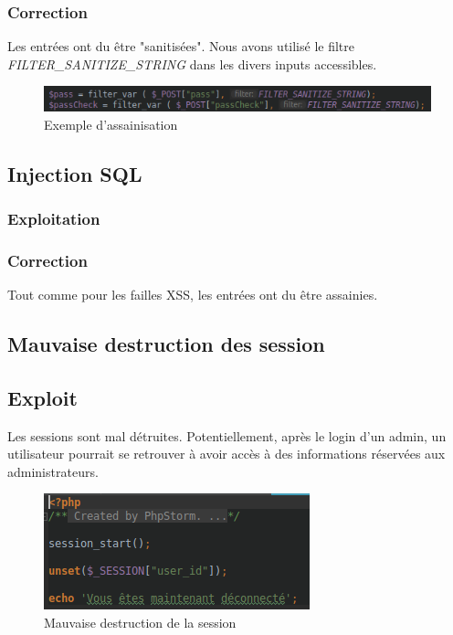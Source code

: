 \documentclass[12pt]{article}
\begin{document}
\subsubsection{Correction}
Les entrées ont du être "sanitisées". Nous avons utilisé le filtre \textit{FILTER\_SANITIZE\_STRING} dans les divers inputs accessibles.
\begin{figure}[H]
\centering
\includegraphics[width=\linewidth]{images/sanitize.png}
\caption{Exemple d'assainisation}
\end{figure}

\subsection{Injection SQL}
\subsubsection{Exploitation}
\subsubsection{Correction}
Tout comme pour les failles XSS, les entrées ont du être assainies.

\subsection{Mauvaise destruction des session}
\subsection{Exploit}
Les sessions sont mal détruites. Potentiellement, après le login d'un admin, un utilisateur pourrait se retrouver à avoir accès à des informations réservées aux administrateurs.
\begin{figure}[H]
\centering
\includegraphics[width=\linewidth]{images/unset.png}
\caption{Mauvaise destruction de la session}
\end{figure}
\end{document}
